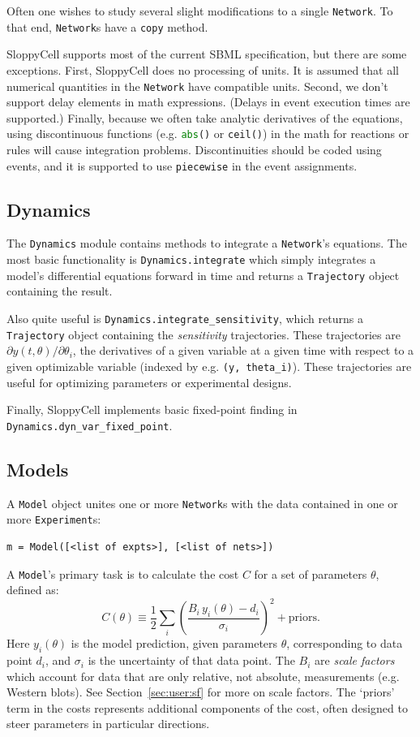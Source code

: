 \documentclass[12pt]{article}
\makeatletter
\newcommand{\py}[1]{\lstinline[language=Python, showstringspaces=False]@#1@}
\makeatother
\begin{document}
Often one wishes to study several slight modifications to a single \py{Network}.
To that end, \py{Network}s have a \py{copy} method.

SloppyCell supports most of the current SBML specification, but there are some exceptions.
First, SloppyCell does no processing of units. It is assumed that all numerical quantities in the \py{Network} have compatible units.
Second, we don't support delay elements in math expressions.
(Delays in event execution times are supported.)
Finally, because we often take analytic derivatives of the equations, using discontinuous functions (e.g. \py{abs()} or \py{ceil()}) in the math for reactions or rules will cause integration problems.
Discontinuities should be coded using events, and it is supported to use \py{piecewise} in the event assignments.

\subsection{Dynamics}
The \py{Dynamics} module contains methods to integrate a \py{Network}'s equations.
The most basic functionality is \py{Dynamics.integrate} which simply integrates a model's differential equations forward in time and returns a \py{Trajectory} object containing the result.

Also quite useful is \py{Dynamics.integrate_sensitivity}, which returns a \py{Trajectory} object containing the \emph{sensitivity} trajectories.
These trajectories are $\partial y(t, \theta)/\partial \theta_i$, the derivatives of a given variable at a given time with respect to a given optimizable variable (indexed by e.g. \py{(y, theta_i)}).
These trajectories are useful for optimizing parameters or experimental designs.

Finally, SloppyCell implements basic fixed-point finding in \py{Dynamics.dyn_var_fixed_point}.

\subsection{Models}
A \py{Model} object unites one or more \py{Network}s with the data contained in one or more \py{Experiment}s:
\begin{lstlisting}
m = Model([<list of expts>], [<list of nets>])
\end{lstlisting}
A \py{Model}'s primary task is to calculate the cost $C$ for a set of parameters $\theta$, defined as:
\begin{equation}
C\left(\theta\right) \equiv \frac{1}{2} \sum_i \left(\frac{B_i\,y_i\left(\theta\right) - d_i}{\sigma_i}\right)^2 + \text{priors}.\label{eqn:user:cost}
\end{equation}
Here $y_i(\theta)$ is the model prediction, given parameters $\theta$, corresponding to data point $d_i$, and $\sigma_i$ is the uncertainty of that data point.
The $B_i$ are \emph{scale factors} which account for data that are only relative, not absolute, measurements (e.g. Western blots).
See Section~\ref{sec:user:sf} for more on scale factors.
The `priors' term in the costs represents additional components of the cost, often designed to steer parameters in particular directions.
\end{document}
